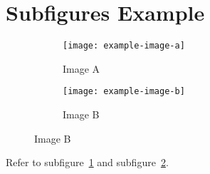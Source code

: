 \documentclass{article}
\begin{document}
\section{Subfigures Example}

\begin{figure}[h!]
\centering

\begin{subfigure}{0.45\textwidth}
  \centering
  \texttt{[image: example-image-a]}
  \caption{Image A}
  \label{fig:subA}
\end{subfigure}
\hfill
\begin{subfigure}{0.45\textwidth}
  \centering
  \texttt{[image: example-image-b]}
  \caption{Image B}
  \label{fig:subB}
\end{subfigure}

\label{fig:bothImages}
\end{figure}

Refer to subfigure~\ref{fig:subA} and subfigure~\ref{fig:subB}.
\end{document}
